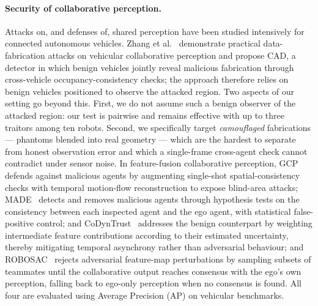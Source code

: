 
\paragraph{Security of collaborative perception.}
Attacks on, and defenses of, shared perception have been studied intensively
for connected autonomous vehicles. Zhang et al.~\cite{zhang2024cad}
demonstrate practical data-fabrication attacks on vehicular collaborative
perception and propose CAD, a detector in which benign vehicles jointly
reveal malicious fabrication through cross-vehicle occupancy-consistency
checks; the
approach therefore relies on benign vehicles positioned to observe the
attacked region. Two aspects of our setting go beyond this. First, we do not
assume such a benign observer of the attacked region: our test is pairwise
and remains effective with up to three traitors among ten robots. Second, we
specifically target \emph{camouflaged} fabrications --- phantoms blended into
real geometry --- which are the hardest to separate from honest observation
error and which a single-frame cross-agent check cannot contradict under
sensor noise. In feature-fusion collaborative perception,
GCP~\cite{gcp2025} defends against malicious agents by augmenting
single-shot spatial-consistency checks with temporal motion-flow
reconstruction to expose blind-area attacks; MADE~\cite{made2024} detects
and removes malicious agents through hypothesis tests on the consistency
between each inspected agent and the ego agent, with statistical
false-positive control; and CoDynTrust~\cite{codyntrust2025} addresses the
benign counterpart by weighting intermediate feature contributions
according to their estimated uncertainty, thereby mitigating temporal
asynchrony rather than adversarial behaviour; and ROBOSAC~\cite{robosac2023}
rejects adversarial feature-map perturbations by sampling subsets of teammates
until the collaborative output reaches consensus with the ego's own perception,
falling back to ego-only perception when no consensus is found. All four are
evaluated using Average Precision (AP) on vehicular benchmarks.

